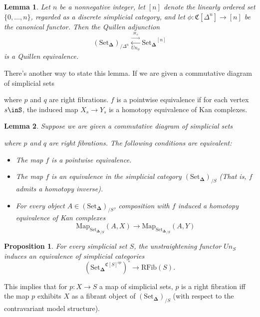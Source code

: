 \documentclass[12pt]{amsart}
\newcommand{\8}{\ensuremath{\infty}}
\newcommand{\SSet}{\ensuremath{\text{Set}_{\boldsymbol{\Delta}}}}
\newcommand{\adj}[2]{\ensuremath{\overset{\overset{#1}{ \rightarrow}}{\underset{#2}{\leftarrow}}}}
\newcommand{\Map}{\ensuremath{\text{Map}}}
\newtheorem{lemma}{Lemma}
\newtheorem{proposition}{Proposition}
\begin{document}
{{\begin{lemma}
  Let $n$ be a nonnegative integer, let $[n]$ denote the linearly ordered set $\{0,\dots,n\}$, regarded as a discrete simplicial category, and let $\phi:\mathfrak{C}[\Delta^n]\rightarrow [n]$ be the canonical functor. Then the Quillen adjunction 
  \[(\SSet)_{/\Delta^n}\adj{St_\phi}{Un_\phi}\SSet^{[n]}\] is a Quillen equivalence.
\end{lemma}

There's another way to state this lemma. If we are given a commutative diagram of simplicial sets 
where $p$ and $q$ are right fibrations. $f$ is a pointwise equivalence if for each vertex $s\inS$, the induced map $X_s\rightarrow Y_s$ is a homotopy equivalence of Kan complexes.

\begin{lemma}
  Suppose we are given a commutative diagram of simplicial sets 
  where $p$ and $q$ are right fibrations. The following conditions are equivalent:
  \begin{itemize}
    \item The map $f$ is a pointwise equivalence.
    \item The map $f$ is an equivalence in the simplicial category $(\SSet)_{/S}$ (That is, $f$ admits a homotopy inverse).
    \item For every object $A\in(\SSet)_{/S}$, composition with $f$ induced a homotopy equivalence of Kan complexes \[\Map_{{\SSet}_{/S}}(A,X)\rightarrow \Map_{{\SSet}_{/S}}(A,Y)\]
  \end{itemize}
\end{lemma}

\begin{proposition}
  For every simplicial set $S$, the unstraightening functor $Un_S$ induces an equivalence of simplicial categories \[(\SSet^{\mathfrak{C}[S]^{op}})^\circ\rightarrow \text{RFib}(S).\]
  
\end{proposition}
This implies that for $p:X\rightarrow S$ a map of simplicial sets, $p$ is a right fibration iff the map $p$ exhibits $X$ as a fibrant object of $(\SSet)_{/S}$ (with respect to the contravariant model structure).

}}
\end{document}
